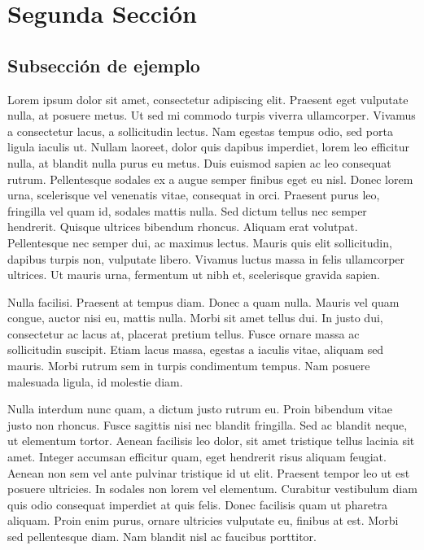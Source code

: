 \section{Segunda Sección}\label{section:two}

\subsection{Subsección de ejemplo}\label{subsection:lorem-ipsum}



Lorem ipsum dolor sit amet, consectetur adipiscing elit. Praesent eget vulputate nulla, at posuere metus. Ut sed mi commodo turpis viverra ullamcorper. Vivamus a consectetur lacus, a sollicitudin lectus. Nam egestas tempus odio, sed porta ligula iaculis ut. Nullam laoreet, dolor quis dapibus imperdiet, lorem leo efficitur nulla, at blandit nulla purus eu metus. Duis euismod sapien ac leo consequat rutrum. Pellentesque sodales ex a augue semper finibus eget eu nisl. Donec lorem urna, scelerisque vel venenatis vitae, consequat in orci. Praesent purus leo, fringilla vel quam id, sodales mattis nulla. Sed dictum tellus nec semper hendrerit. Quisque ultrices bibendum rhoncus. Aliquam erat volutpat. Pellentesque nec semper dui, ac maximus lectus. Mauris quis elit sollicitudin, dapibus turpis non, vulputate libero. Vivamus luctus massa in felis ullamcorper ultrices. Ut mauris urna, fermentum ut nibh et, scelerisque gravida sapien.

Nulla facilisi. Praesent at tempus diam. Donec a quam nulla. Mauris vel quam congue, auctor nisi eu, mattis nulla. Morbi sit amet tellus dui. In justo dui, consectetur ac lacus at, placerat pretium tellus. Fusce ornare massa ac sollicitudin suscipit. Etiam lacus massa, egestas a iaculis vitae, aliquam sed mauris. Morbi rutrum sem in turpis condimentum tempus. Nam posuere malesuada ligula, id molestie diam.

Nulla interdum nunc quam, a dictum justo rutrum eu. Proin bibendum vitae justo non rhoncus. Fusce sagittis nisi nec blandit fringilla. Sed ac blandit neque, ut elementum tortor. Aenean facilisis leo dolor, sit amet tristique tellus lacinia sit amet. Integer accumsan efficitur quam, eget hendrerit risus aliquam feugiat. Aenean non sem vel ante pulvinar tristique id ut elit. Praesent tempor leo ut est posuere ultricies. In sodales non lorem vel elementum. Curabitur vestibulum diam quis odio consequat imperdiet at quis felis. Donec facilisis quam ut pharetra aliquam. Proin enim purus, ornare ultricies vulputate eu, finibus at est. Morbi sed pellentesque diam. Nam blandit nisl ac faucibus porttitor.

